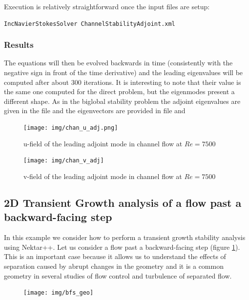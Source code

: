 Execution is relatively straightforward once the input files are setup:

\texttt{IncNavierStokesSolver ChannelStabilityAdjoint.xml}

\subsubsection*{Results}

The equations will then be evolved backwards in time (consistently
with the negative sign in front of the time derivative) and the
leading eigenvalues will be computed after about 300 iterations. It is
interesting to note that their value is the same one computed for the
direct problem, but the eigenmodes present a different shape.  As in
the biglobal stability problem the adjoint eigenvalues are given in
the file  and the eigenvectors are
provided in file  and

\begin{figure}[!htbp]
\centering
 {\texttt{[image: img/chan\_u\_adj.png]}}
   \caption {u-field of the leading adjoint mode in channel flow at $Re=7500$}
\end{figure}

\begin{figure}[!htbp]
\centering
 {\texttt{[image: img/chan\_v\_adj]}}
   \caption {v-field of the leading adjoint mode in channel flow at $Re=7500$}
\end{figure}

\clearpage
\subsection{2D Transient Growth analysis of a flow past a backward-facing step}

In this example we consider how to perform a transient growth
stability analysis using Nektar++. Let us consider a flow past a
backward-facing step (figure \ref{bfs_geo}). This is an important case
because it allows us to understand the effects of separation caused by
abrupt changes in the geometry and it is a common geometry in several
studies of flow control and turbulence of separated flow.

\begin{figure}[!htbp]
\centering
 {\texttt{[image: img/bfs\_geo]}}
    \caption {}\label{bfs_geo}
\end{figure}

